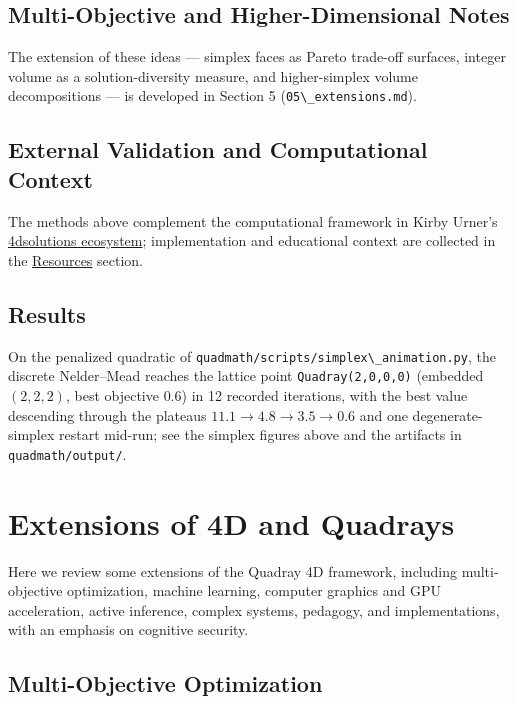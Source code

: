 \documentclass[
  10pt,
]{article}
\newcommand{\passthrough}[1]{#1}
\begin{document}
\subsection{Multi-Objective and Higher-Dimensional
Notes}\label{multi-objective-and-higher-dimensional-notes}

The extension of these ideas --- simplex faces as Pareto trade-off
surfaces, integer volume as a solution-diversity measure, and
higher-simplex volume decompositions --- is developed in Section 5
(\passthrough{\lstinline!05\_extensions.md!}).

\subsection{External Validation and Computational
Context}\label{external-validation-and-computational-context}

The methods above complement the computational framework in Kirby
Urner's \href{https://github.com/4dsolutions}{4dsolutions ecosystem};
implementation and educational context are collected in the
\href{07_resources.md}{Resources} section.

\subsection{Results}\label{results}

On the penalized quadratic of
\passthrough{\lstinline!quadmath/scripts/simplex\_animation.py!}, the
discrete Nelder--Mead reaches the lattice point
\passthrough{\lstinline!Quadray(2,0,0,0)!} (embedded \((2, 2, 2)\), best
objective \(0.6\)) in 12 recorded iterations, with the best value
descending through the plateaus \(11.1 \to 4.8 \to 3.5 \to 0.6\) and one
degenerate-simplex restart mid-run; see the simplex figures above and
the artifacts in \passthrough{\lstinline!quadmath/output/!}.

\newpage

\section{Extensions of 4D and
Quadrays}\label{extensions-of-4d-and-quadrays}

Here we review some extensions of the Quadray 4D framework, including
multi-objective optimization, machine learning, computer graphics and
GPU acceleration, active inference, complex systems, pedagogy, and
implementations, with an emphasis on cognitive security.

\subsection{Multi-Objective
Optimization}\label{multi-objective-optimization}
\end{document}
